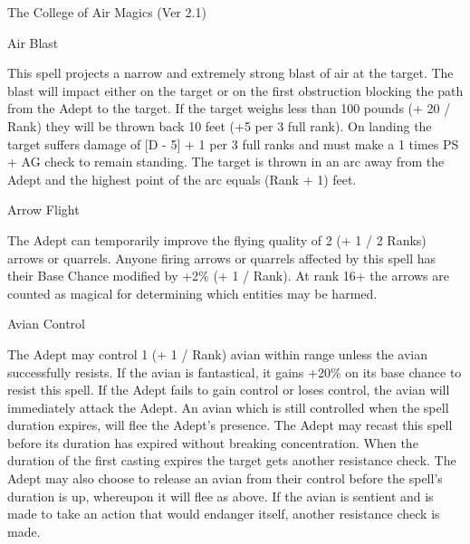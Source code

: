 \begin{Chapter}{The College of Air Magics (Ver 2.1)}
\begin{spell}[S-1]{Air Blast}
\begin{effects}
This spell projects a narrow and extremely strong blast of air at the
target.  The blast will impact either on the target or on the first
obstruction blocking the path from the Adept to the target.  If the
target weighs less than 100 pounds (+ 20 / Rank) they will be thrown
back 10 feet (+5 per 3 full rank). On landing the target suffers
damage of [D - 5] + 1 per 3 full ranks and must make a 1 times PS + AG
check to remain standing.  The target is thrown in an arc away from
the Adept and the highest point of the arc equals (Rank + 1) feet.
\end{effects}
\end{spell}

\begin{spell}[S-2]{Arrow Flight}

\begin{effects}
The Adept can temporarily improve the flying quality of 2 (+ 1 / 2
Ranks) arrows or quarrels.  Anyone firing arrows or quarrels affected
by this spell has their Base Chance modified by +2\% (+ 1 / Rank). At
rank 16+ the arrows are counted as magical for determining which
entities may be harmed.
\end{effects}
\end{spell}

\begin{spell}[S-3]{Avian Control}

\begin{effects}
The Adept may control 1 (+ 1 / Rank) avian within range unless the
avian successfully resists. If the avian is fantastical, it gains
+20\% on its base chance to resist this spell. If the Adept fails to
gain control or loses control, the avian will immediately attack the
Adept.  An avian which is still controlled when the spell duration
expires, will flee the Adept’s presence.  The Adept may recast this
spell before its duration has expired without breaking concentration.
When the duration of the first casting expires the target gets another
resistance check.  The Adept may also choose to release an avian from
their control before the spell’s duration is up, whereupon it will
flee as above.  If the avian is sentient and is made to take an action
that would endanger itself, another resistance check is made.
\end{effects}
\end{spell}


\end{Chapter}
